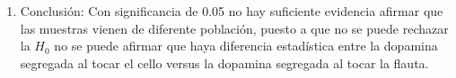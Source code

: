 \begin{enumerate}
    \item Conclusión: Con significancia de 0.05 no hay suficiente evidencia afirmar que las muestras vienen de diferente población, puesto a que no se puede rechazar la $H_0$ no se puede afirmar que haya diferencia estadística entre la dopamina segregada al tocar el cello versus la dopamina segregada al tocar la flauta.
\end{enumerate}
